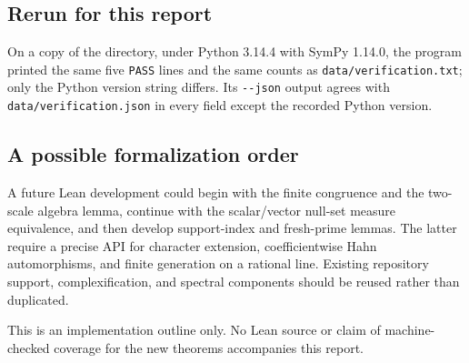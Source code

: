 \documentclass[11pt,oneside]{article}
\theoremstyle{definition}
\theoremstyle{remark}
\begin{document}
\subsection{Rerun for this report}\label{hnd:app:reproduce}

On a copy of the directory, under Python 3.14.4 with SymPy 1.14.0, the
program printed the same five \texttt{PASS} lines and the same counts as
\texttt{data/verification.txt}; only the Python version string differs.
Its \texttt{-{}-json} output agrees with \texttt{data/verification.json} in
every field except the recorded Python version.

\subsection{A possible formalization order}

A future Lean development could begin with the finite congruence and
the two-scale algebra lemma, continue with the scalar/vector null-set
measure equivalence, and then develop support-index and fresh-prime
lemmas. The latter require a precise API for character extension,
coefficientwise Hahn automorphisms, and finite generation on a rational
line. Existing repository support, complexification, and spectral
components should be reused rather than duplicated.

This is an implementation outline only. No Lean source or claim of
machine-checked coverage for the new theorems accompanies this report.
\end{document}
